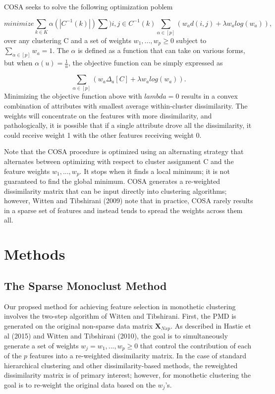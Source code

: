 \documentclass[
]{article}
\begin{document}
COSA seeks to solve the following optimization poblem

\[minimize \sum_{k \in K} \alpha(|C^{-1}(k)|) \sum){i,j \in C^{-1}(k)} \sum_{\alpha \in [p]}(w_a d(i,j) + \lambda w_alog(w_a)),\]
over any clustering C and a set of weights \(w_1,...,w_p \geq 0\)
subject to \(\sum_{\alpha \in [p]} w_a = 1\). The \(\alpha\) is defined
as a function that can take on various forms, but when
\(\alpha(u) = \frac{1}{u}\), the objective function can be simply
expressed as

\[\sum_{\alpha \in [p]} (w_a\Delta_a[C] + \lambda w_a log(w_a)).\]
Minimizing the objective function above with \(lambda = 0\) results in a
convex combination of attributes with smallest average within-cluster
dissimilarity. The weights will concentrate on the features with more
dissimilarity, and pathologically, it is possible that if a single
attribute drove all the dissimilarity, it could receive weight 1 with
the other features receiving weight 0.

Note that the COSA procedure is optimized using an alternating strategy
that alternates between optimizing with respect to cluster assignment C
and the feature weights \(w_1,...,w_p\). It stops when it finds a local
minimum; it is not guaranteed to find the global minimum. COSA generates
a re-weighted dissimilarity matrix that can be input directly into
clustering algorithms; however, Witten and Tibshirani (2009) note that
in practice, COSA rarely results in a sparse set of features and instead
tends to spread the weights across them all.

\hypertarget{methods}{%
\section{Methods}\label{methods}}

\hypertarget{the-sparse-monoclust-method}{%
\subsection{The Sparse Monoclust
Method}\label{the-sparse-monoclust-method}}

Our propsed method for achieving feature selection in monothetic
clustering involves the two-step algorithm of Witten and Tibshirani.
First, the PMD is generated on the original non-sparse data matrix
\(\boldsymbol{X}_{Nxp}\). As described in Hastie et al (2015) and Witten
and Tibshirani (2010), the goal is to simultaneously generate a set of
weights \(w_j = w_1,...,w_p \geq 0\) that control the contribution of
each of the \(p\) features into a re-weighted dissimilarity matrix. In
the case of standard hierarchical clustering and other
dissimilarity-based methods, the reweighted dissimilarity matrix is of
primary interest; however, for monothetic clustering the goal is to
re-weight the original data based on the \(w_j\)'s.
\end{document}
